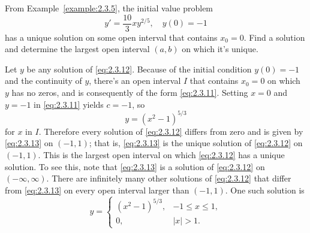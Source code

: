 \documentclass{ximera}
\begin{document}

\begin{example} \label{example:2.3.7}
From Example~\ref{example:2.3.5}, the initial value
problem
\begin{equation} \label{eq:2.3.12}
y'=\frac{10}{3}xy^{2/5}, \quad y(0)=-1
\end{equation}
 has a  unique solution on some open interval that contains $x_0=0$.
Find a solution and determine the largest open interval $(a,b)$ on
which it's unique.

\begin{explanation}
Let $y$ be any solution of \eqref{eq:2.3.12}. Because of the initial
condition $y(0)=-1$ and the continuity of $y$, there's an open interval
$I$ that contains $x_0=0$ on which $y$ has no zeros, and is consequently
of the form \eqref{eq:2.3.11}. Setting $x=0$ and $y=-1$ in \eqref{eq:2.3.11}
yields $c=-1$, so
\begin{equation} \label{eq:2.3.13}
y=(x^2-1)^{5/3}
\end{equation}
for $x$  in $I$.
Therefore every solution of \eqref{eq:2.3.12} differs from zero
and is given by \eqref{eq:2.3.13} on $(-1,1)$; that is,
\eqref{eq:2.3.13} is the unique solution of \eqref{eq:2.3.12} on
$(-1,1)$.
 This is the largest open interval on which
\eqref{eq:2.3.12} has a unique solution. To see this, note that
\eqref{eq:2.3.13} is a solution of \eqref{eq:2.3.12} on $(-\infty,\infty)$.
There are infinitely many other solutions
of \eqref{eq:2.3.12} that differ from \eqref{eq:2.3.13} on every open interval
larger than
$(-1,1)$. One such solution is
$$
y = \left\{ \begin{array}{cl}
(x^2-1)^{5/3}, & -1 \le x \le 1, \\[6pt]
0,             & |x|>1. \end{array} \right.
$$

\begin{center}
\end{center}




\end{explanation}
\end{example}
\end{document}
